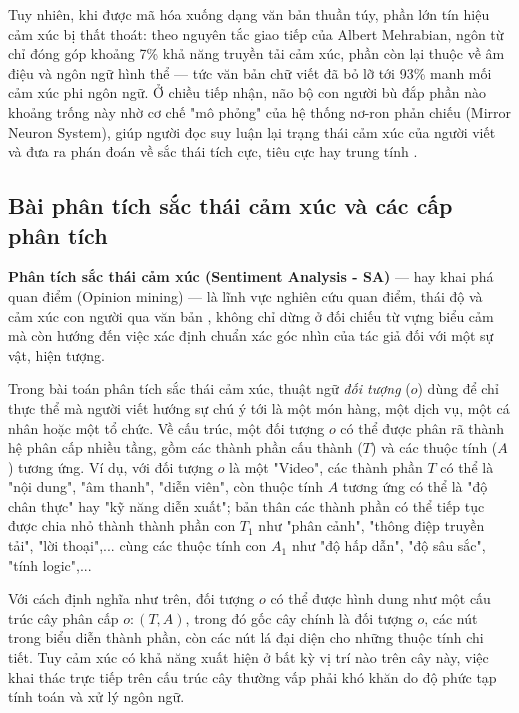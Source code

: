 Tuy nhiên, khi được mã hóa xuống dạng văn bản thuần túy, phần lớn tín hiệu cảm xúc bị thất thoát: theo nguyên tắc giao tiếp của Albert Mehrabian, ngôn từ chỉ đóng góp khoảng 7\% khả năng truyền tải cảm xúc, phần còn lại thuộc về âm điệu và ngôn ngữ hình thể \parencite{mehrabian1971silent} — tức văn bản chữ viết đã bỏ lỡ tới 93\% manh mối cảm xúc phi ngôn ngữ. Ở chiều tiếp nhận, não bộ con người bù đắp phần nào khoảng trống này nhờ cơ chế "mô phỏng" của hệ thống nơ-ron phản chiếu (Mirror Neuron System), giúp người đọc suy luận lại trạng thái cảm xúc của người viết và đưa ra phán đoán về sắc thái tích cực, tiêu cực hay trung tính \parencite{iacoboni2009imitation}.

\subsection{Bài phân tích sắc thái cảm xúc và các cấp phân tích}

\textbf{Phân tích sắc thái cảm xúc (Sentiment Analysis - SA)} — hay khai phá quan điểm (Opinion mining) — là lĩnh vực nghiên cứu quan điểm, thái độ và cảm xúc con người qua văn bản \parencite{liu2010sentiment}, không chỉ dừng ở đối chiếu từ vựng biểu cảm mà còn hướng đến việc xác định chuẩn xác góc nhìn của tác giả đối với một sự vật, hiện tượng.

Trong bài toán phân tích sắc thái cảm xúc, thuật ngữ \textit{đối tượng} ($o$) dùng để chỉ thực thể mà người viết hướng sự chú ý tới là một món hàng, một dịch vụ, một cá nhân hoặc một tổ chức. Về cấu trúc, một đối tượng $o$ có thể được phân rã thành hệ phân cấp nhiều tầng, gồm các thành phần cấu thành ($T$) và các thuộc tính ($A$) tương ứng. Ví dụ, với đối tượng $o$ là một "Video", các thành phần $T$ có thể là "nội dung", "âm thanh", "diễn viên", còn thuộc tính $A$ tương ứng có thể là "độ chân thực" hay "kỹ năng diễn xuất"; bản thân các thành phần có thể tiếp tục được chia nhỏ thành thành phần con $T_1$ như "phân cảnh", "thông điệp truyền tải", "lời thoại",... cùng các thuộc tính con $A_1$ như "độ hấp dẫn", "độ sâu sắc", "tính logic",...

Với cách định nghĩa như trên, đối tượng $o$ có thể được hình dung như một cấu trúc cây phân cấp $o: (T, A)$, trong đó gốc cây chính là đối tượng $o$, các nút trong biểu diễn thành phần, còn các nút lá đại diện cho những thuộc tính chi tiết. Tuy cảm xúc có khả năng xuất hiện ở bất kỳ vị trí nào trên cây này, việc khai thác trực tiếp trên cấu trúc cây thường vấp phải khó khăn do độ phức tạp tính toán và xử lý ngôn ngữ.

